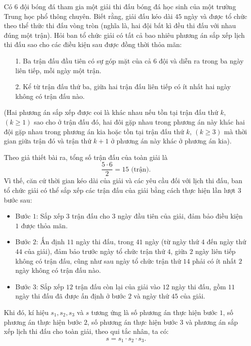 \begin{bt}%
	Có $6$ đội bóng đá tham gia một giải thi đấu bóng đá học sinh của một trường Trung học phổ thông chuyên. Biết rằng, giải đấu kéo dài $45$ ngày và được tổ chức theo thể thức thi đấu vòng tròn (nghĩa là, hai đội bất kì đều thi đấu với nhau đúng một trận). Hỏi ban tổ chức giải có tất cả bao nhiêu phương án sắp xếp lịch thi đấu sao cho các điều kiện sau được đồng thời thỏa mãn:
	\begin{itemize}
		\item[1.] 	Ba trận đấu đầu tiên có sự góp mặt của cả $6$ đội và diễn ra trong ba ngày liên tiếp, mỗi ngày một trận.	
		\item[2.] Kể từ trận đấu thứ ba, giữa hai trận đấu liên tiếp có ít nhất hai ngày không có trận đấu nào.
	\end{itemize}
	(Hai phương án sắp xếp được coi là khác nhau nếu tồn tại trận đấu thứ $k$, $(k \ge 1)$ sao cho ở trận đấu đó, hai đôi gặp nhau trong phương án này khác hai đội gặp nhau trong phương án kia hoặc tồn tại trận đấu thứ $k$, $(k \ge 3)$ mà thời gian giữa trận đó và trận thứ $k+1$ ở phương án này khác ở phương án kia).
	\loigiai
	{Theo giả thiết bài ra, tổng số trận đấu của toàn giải là $$\dfrac{5\cdot 6}{2}=15 \text{ (trận).}$$
		Vì thế, căn cứ thời gian kéo dài của giải và các yêu cầu đối với lịch thi đấu, ban tổ chức giải có thể sắp xếp các trận đấu của giải bằng cách thực hiện lần lượt $3$ bước sau:
		\begin{itemize}
			\item Bước $1$: Sắp xếp $3$ trận đấu cho $3$ ngày đầu tiên của giải, đảm bảo điều kiện $1$ được thỏa mãn.
			\item Bước $2$: Ấn định $11$ ngày thi đấu, trong $41$ ngày (từ ngày thứ $4$ đến ngày thứ $44$ của giải), đảm bảo trước ngày tổ chức trận thứ $4$, giữa $2$ ngày liên tiếp không có trận đấu, cũng như sau ngày tổ chức trận thứ $14$ phải có ít nhất $2$ ngày không có trận đấu nào.
			\item Bước $3$: Sắp xếp $12$ trận đấu còn lại của giải vào $12$ ngày thi đấu, gồm $11$ ngày thi đấu đã được ấn định ở bước $2$ và ngày thứ $45$ của giải.
		\end{itemize}
		Khi đó, kí hiệu $s_1, s_2,s_3$ và $s$ tương ứng là số phương án thực hiện bước $1$, số phương án thực hiện bước $2$, số phương án thực hiện bước $3$ và phương án sắp xếp lịch thi đấu cho toàn giải, theo qui tắc nhân, ta có:
		\begin{align}
		s=s_1\cdot s_2\cdot s_3. \tag{1}

\end{align}}
\end{bt}

